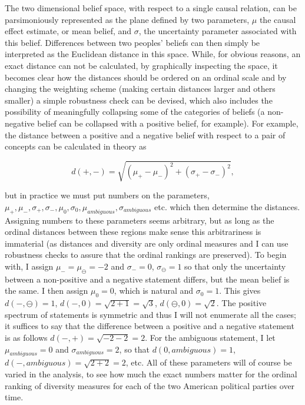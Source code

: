 \documentclass[12pt]{article}
\begin{document}
The two dimensional belief space, with respect to a single causal relation, can be parsimoniously represented as the plane defined by two parameters, $\mu$ the causal effect estimate, or mean belief, and $\sigma$, the uncertainty parameter associated with this belief. Differences between two peoples' beliefs can then simply be interpreted as the Euclidean distance in this space.  While, for obvious reasons, an exact distance can not be calculated, by graphically inspecting the space, it becomes clear how the distances should be ordered on an ordinal scale and by changing the weighting scheme (making certain distances larger and others smaller) a simple robustness check can be devised, which also includes the possibility of meaningfully collapsing some of the categories of beliefs (a non-negative belief can be collapsed with a positive belief, for example). For example, the distance between a positive and a negative belief with respect to a pair of concepts can be calculated in theory as

$$d(+, -)=\sqrt{(\mu_{+}-\mu_{-})^2 + (\sigma_{+}-\sigma_{-})^2},$$      

but in practice we must put numbers on the parameters, $\mu_{+}, \mu_{-}, \sigma_{+}, \sigma_{-}, \mu_{0}, \sigma_{0}, \mu_{ambiguous}, \sigma_{ambiguous}$ etc. which then determine the distances. Assigning numbers to these parameters seems arbitrary, but as long as the ordinal distances between these regions make sense this arbitrariness is immaterial (as distances and diversity are only ordinal measures and I can use robustness checks to assure that the ordinal rankings are preserved). To begin with, I assign $\mu_{-}=\mu_{\ominus}=-2$ and $\sigma_{-}=0$, $\sigma_{\ominus}=1$ so that only the uncertainty between a non-positive and a negative statement differs, but the mean belief is the same. I then assign $\mu_{0}=0$, which is natural and $\sigma_{0}=1$. This gives $d(-, \ominus)=1$, $d(-, 0)=\sqrt{2+1}=\sqrt{3}$, $d(\ominus, 0)=\sqrt{2}.$ The positive spectrum of statements is symmetric and thus I will not enumerate all the cases; it suffices to say that the difference between a positive and a negative statement is as follows $d(-, +)=\sqrt{-2-2}=2.$ For the ambiguous statement, I let $\mu_{ambiguous}=0$ and $\sigma_{ambiguous}=2$, so that $d(0, ambiguous)=1$, $d(-, ambiguous)=\sqrt{2 + 2}=2$, etc. All of these parameters will of course be varied in the analysis, to see how much the exact numbers matter for the ordinal ranking of diversity measures for each of the two American political parties over time.      
\end{document}
